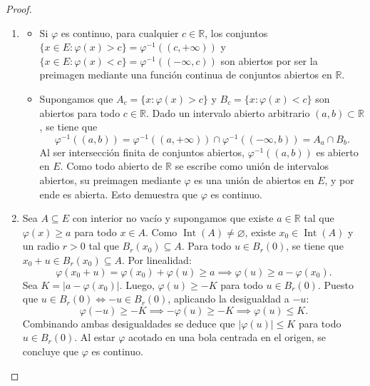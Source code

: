 \documentclass{article}
\theoremstyle{definition}
\newcommand{\R}{\mathbb{R}}
\begin{document}
\begin{proof}
\begin{enumerate}
        \item
              \begin{itemize}
                  \item[(\( \Rightarrow \))] Si \( \varphi \) es continuo, para cualquier \( c \in \R \), los conjuntos \( \{x \in E : \varphi(x) > c\} = \varphi^{-1}((c, +\infty))\) y \( \{x \in E : \varphi(x) < c\} = \varphi^{-1}((-\infty, c))\) son abiertos por ser la preimagen mediante una función continua de conjuntos abiertos en \( \R \).
                  \item[(\( \Leftarrow \))] Supongamos que \(A_c = \{x : \varphi(x) > c\} \) y \(B_c = \{x : \varphi(x) < c\} \) son abiertos para todo \(c \in \R \). Dado un intervalo abierto arbitrario \((a, b) \subset \R \), se tiene que
                        \[
                            \varphi^{-1}((a, b)) = \varphi^{-1}((a, +\infty)) \cap \varphi^{-1}((-\infty, b)) = A_a \cap B_b.
                        \]
                        Al ser intersección finita de conjuntos abiertos, \(\varphi^{-1}((a, b))\) es abierto en \(E\). Como todo abierto de \(\R \) se escribe como unión de intervalos abiertos, su preimagen mediante \(\varphi \) es una unión de abiertos en \(E\), y por ende es abierta. Esto demuestra que \(\varphi \) es continuo.
              \end{itemize}

        \item Sea \(A \subseteq E\) con interior no vacío y supongamos que existe \(a \in \R \) tal que \(\varphi(x) \geq a\) para todo \(x \in A\).
              Como \(\operatorname{Int}(A) \neq \varnothing \), existe \(x_0 \in \operatorname{Int}(A)\) y un radio \(r > 0\) tal que \(B_r(x_0) \subseteq A\).
              Para todo \(u \in B_r(0)\), se tiene que \(x_0 + u \in B_r(x_0) \subseteq A\). Por linealidad:
              \[
                  \varphi(x_0 + u) = \varphi(x_0) + \varphi(u) \geq a \implies \varphi(u) \geq a - \varphi(x_0).
              \]
              Sea \(K = |a - \varphi(x_0)|\). Luego, \(\varphi(u) \geq -K\) para todo \(u \in B_r(0)\).
              Puesto que \(u \in B_r(0) \iff -u \in B_r(0)\), aplicando la desigualdad a \(-u\):
              \[
                  \varphi(-u) \geq -K \implies -\varphi(u) \geq -K \implies \varphi(u) \leq K.
              \]
              Combinando ambas desigualdades se deduce que \(|\varphi(u)| \leq K\) para todo \(u \in B_r(0)\).
              Al estar \(\varphi \) acotado en una bola centrada en el origen, se concluye que \(\varphi \) es continuo.
    \end{enumerate}
\end{proof}
\end{document}
